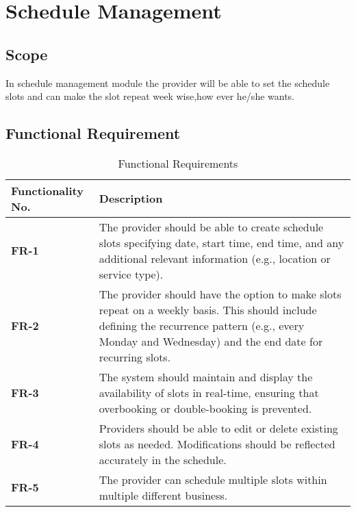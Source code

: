 \documentclass[12pt,a4paper]{article}
\begin{document}
	
 
 \clearpage
 \tableofcontents
 \clearpage
\section{Schedule Management}
\subsection{Scope}
In schedule management module the provider will be able to set the schedule slots and can make the slot repeat week wise,how ever he/she wants.
\subsection{Functional Requirement}
\begin{table}[h!]
\caption{Functional Requirements}
    \centering
    \begin{tabular}{|l|p{7cm}|}
    \hline
       \textbf{Functionality No.}&\textbf{Description} \\ %
       \hline
       \textbf{FR-1}&The provider should be able to create schedule slots specifying date, start time, end time, and any additional relevant information (e.g., location or service type).\\ %
       \hline
         \textbf{FR-2}&The provider should have the option to make slots repeat on a weekly basis. This should include defining the recurrence pattern (e.g., every Monday and Wednesday) and the end date for recurring slots.\\ %
       \hline
       \textbf{FR-3}& The system should maintain and display the availability of slots in real-time, ensuring that overbooking or double-booking is prevented.\\ %
       \hline
     
       \textbf{FR-4}& Providers should be able to edit or delete existing slots as needed. Modifications should be reflected accurately in the schedule.\\ %
       \hline
       \textbf{FR-5}&The provider can schedule multiple slots within multiple different  business.\\ %
       \hline
    \end{tabular}
\end{table}
\newpage
\end{document}
